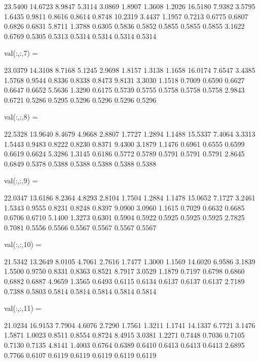 \documentclass[a4paper,12pt]{ctexart}
\begin{document}
\begin{footnotesize}
   23.5400   14.6723    8.9847    5.3114    3.0869    1.8907    1.3608    1.2026
   16.5180    7.9382    3.5795    1.6435    0.9811    0.8616    0.8614    0.8748
   10.2319    3.4437    1.1957    0.7213    0.6775    0.6807    0.6826    0.6831
    5.8711    1.3788    0.6305    0.5836    0.5852    0.5855    0.5855    0.5855
    3.1622    0.6769    0.5305    0.5313    0.5314    0.5314    0.5314    0.5314


val(:,:,7) =

   23.0379   14.3108    8.7168    5.1245    2.9698    1.8157    1.3138    1.1658
   16.0174    7.6547    3.4385    1.5768    0.9544    0.8336    0.8338    0.8473
    9.8131    3.3030    1.1518    0.7009    0.6590    0.6627    0.6647    0.6652
    5.5636    1.3290    0.6175    0.5739    0.5755    0.5758    0.5758    0.5758
    2.9843    0.6721    0.5286    0.5295    0.5296    0.5296    0.5296    0.5296


val(:,:,8) =

   22.5328   13.9640    8.4679    4.9668    2.8807    1.7727    1.2894    1.1488
   15.5337    7.4064    3.3313    1.5443    0.9483    0.8222    0.8230    0.8371
    9.4300    3.1879    1.1476    0.6961    0.6555    0.6599    0.6619    0.6624
    5.3286    1.3145    0.6186    0.5772    0.5789    0.5791    0.5791    0.5791
    2.8645    0.6849    0.5378    0.5388    0.5388    0.5388    0.5388    0.5388


val(:,:,9) =

   22.0347   13.6186    8.2364    4.8293    2.8104    1.7504    1.2884    1.1478
   15.0652    7.1727    3.2461    1.5343    0.9555    0.8231    0.8248    0.8397
    9.0900    3.0960    1.1615    0.7029    0.6632    0.6685    0.6706    0.6710
    5.1400    1.3273    0.6301    0.5904    0.5922    0.5925    0.5925    0.5925
    2.7825    0.7081    0.5556    0.5566    0.5567    0.5567    0.5567    0.5567


val(:,:,10) =

   21.5342   13.2649    8.0105    4.7061    2.7616    1.7477    1.3000    1.1569
   14.6020    6.9586    3.1839    1.5500    0.9750    0.8331    0.8363    0.8521
    8.7917    3.0529    1.1879    0.7197    0.6798    0.6860    0.6882    0.6887
    4.9659    1.3565    0.6493    0.6115    0.6134    0.6137    0.6137    0.6137
    2.7189    0.7388    0.5803    0.5814    0.5814    0.5814    0.5814    0.5814


val(:,:,11) =

   21.0234   16.9153    7.7904    4.6076    2.7290    1.7561    1.3211    1.1741
   14.1337    6.7721    3.1476    1.5871    1.0023    0.8511    0.8554    0.8724
    8.4915    3.0381    1.2271    0.7448    0.7036    0.7105    0.7130    0.7135
    4.8141    1.4003    0.6764    0.6389    0.6410    0.6413    0.6413    0.6413
    2.6895    0.7766    0.6107    0.6119    0.6119    0.6119    0.6119    0.6119



\end{footnotesize}
\end{document}
